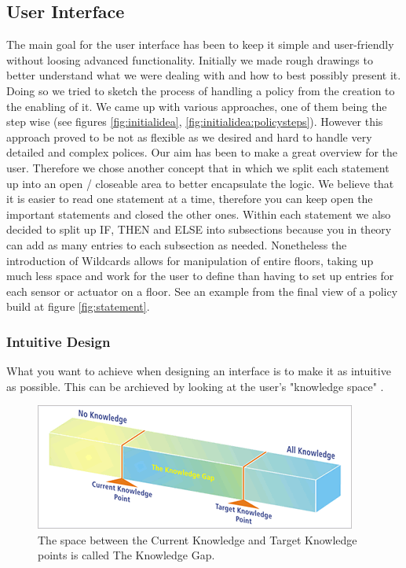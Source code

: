 \subsection{User Interface}
The main goal for the user interface has been to keep it simple and user-friendly without loosing advanced functionality. Initially we made rough drawings to better understand what we were dealing with and how to best possibly present it. Doing so we tried to sketch the process of handling a policy from the creation to the enabling of it. We came up with various approaches, one of them being the step wise (see figures \ref{fig:initialidea}, \ref{fig:initialidea:policysteps}). However this approach proved to be not as flexible as we desired and hard to handle very detailed and complex polices. Our aim has been to make a great overview for the user. Therefore we chose another concept that in which we split each statement up into an open / closeable area to better encapsulate the logic. We believe that it is easier to read one statement at a time, therefore you can keep open the important statements and closed the other ones. Within each statement we also decided to split up IF, THEN and ELSE into subsections because you in theory can add as many entries to each subsection as needed. Nonetheless the introduction of Wildcards allows for manipulation of entire floors, taking up much less space and work for the user to define than having to set up entries for each sensor or actuator on a floor. See an example from the final view of a policy build at figure \ref{fig:statement}.

\subsubsection{Intuitive Design}
What you want to achieve when designing an interface is to make it as intuitive as possible. This can be archieved by looking at the user's "knowledge space" \cite{intuitivedesign}.

\begin{figure}[ht]
\centering
\includegraphics[width=\columnwidth]{knowledge-brick-3.png}
\caption{The space between the Current Knowledge and Target Knowledge points is called The Knowledge Gap.}
\label{fig:intuitivedesign}
\end{figure}

